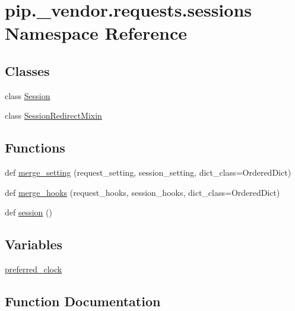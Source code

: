 \hypertarget{namespacepip_1_1__vendor_1_1requests_1_1sessions}{}\section{pip.\+\_\+vendor.\+requests.\+sessions Namespace Reference}
\label{namespacepip_1_1__vendor_1_1requests_1_1sessions}
\subsection*{Classes}
\begin{DoxyCompactItemize}
\item 
class \hyperlink{classpip_1_1__vendor_1_1requests_1_1sessions_1_1Session}{Session}
\item 
class \hyperlink{classpip_1_1__vendor_1_1requests_1_1sessions_1_1SessionRedirectMixin}{Session\+Redirect\+Mixin}
\end{DoxyCompactItemize}
\subsection*{Functions}
\begin{DoxyCompactItemize}
\item 
def \hyperlink{namespacepip_1_1__vendor_1_1requests_1_1sessions_a4f29ff9c970b63962ea01301a9b406e4}{merge\+\_\+setting} (request\+\_\+setting, session\+\_\+setting, dict\+\_\+class=Ordered\+Dict)
\item 
def \hyperlink{namespacepip_1_1__vendor_1_1requests_1_1sessions_ad4b4950ea137a1727b4b84551756171a}{merge\+\_\+hooks} (request\+\_\+hooks, session\+\_\+hooks, dict\+\_\+class=Ordered\+Dict)
\item 
def \hyperlink{namespacepip_1_1__vendor_1_1requests_1_1sessions_acc89a2821821ae3e690b07883d088881}{session} ()
\end{DoxyCompactItemize}
\subsection*{Variables}
\begin{DoxyCompactItemize}
\item 
\hyperlink{namespacepip_1_1__vendor_1_1requests_1_1sessions_a0618d2af0b89575673584b3f3a7ec0c4}{preferred\+\_\+clock}
\end{DoxyCompactItemize}


\subsection{Function Documentation}
\mbox{\label{namespacepip_1_1__vendor_1_1requests_1_1sessions_ad4b4950ea137a1727b4b84551756171a}} 
